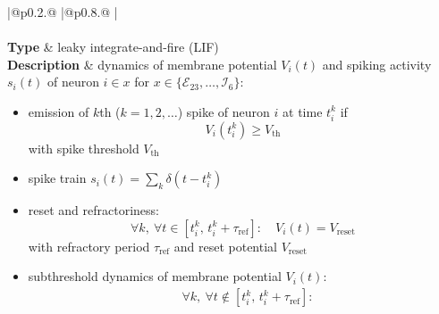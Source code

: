 \documentclass[10pt,a4paper,twoside,american]{article}
\theoremstyle{definitionstyle}
\newcommand{\tauR}{\tau_\text{ref}}
\begin{document}
\begin{table}[H]
\renewcommand{\arraystretch}{1.2}
\begin{tabular}{
  |@{\hspace*{\marg}}p{}@{\hspace*{\marg}}
  |@{\hspace*{\marg}}p{}@{\hspace*{\marg}}
  |}
  \hline 
  \\
  \hline
  \\
  \hline
  \textbf{Type} & leaky integrate-and-fire (LIF)\\
  \hline 
  \textbf{Description} & dynamics of membrane potential $V_{i}(t)$ and spiking activity $s_i(t)$ of neuron $i\in x$ for $x\in\{\mathcal{E}_{23},\ldots,\mathcal{I}_{6}\}$:
                         \begin{itemize}
                         \item emission of $k$th ($k=1,2,\ldots$) spike of neuron $i$ at time $t_{i}^{k}$ if
                           \begin{equation}
                             V_{i}\left(t_{i}^{k}\right)\geq{}V_\text{th}  
                           \end{equation}
                           with spike threshold $V_\text{th}$
                         \item spike train $\displaystyle s_i(t)=\sum_k \delta(t-t_i^k)$                           
                         \item reset and refractoriness:
                           \begin{equation}
				   \forall{}k,\ \forall t \in \left[t_{i}^{k},\,t_{i}^{k}+\tauR\right]:\quad V_{i}(t)=V_\text{reset}  
                           \end{equation}
                            with refractory period $\tauR$ and reset potential $V_\text{reset}$
                         \item subthreshold dynamics of membrane potential $V_{i}(t)$:
                           \begin{equation}
			     \label{eq:membrane_potential}
                             \begin{aligned}
                               &\forall{}k,\ \forall t \notin \left[t_{i}^{k},\,t_{i}^{k}+\tauR\right]:\\

\end{aligned}
\end{equation}
\end{itemize}
\end{tabular}
\end{table}
\end{document}
